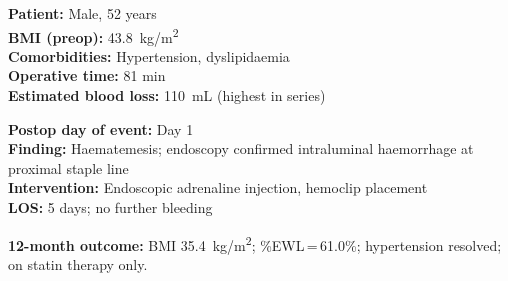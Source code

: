 \documentclass[11pt,a4paper]{article}
\begin{document}
\begin{tcolorbox}[casebox, title={\faUser\enspace Case 2\enspace\textendash\enspace
  Grade IIIa Complication: Staple-Line Haemorrhage}]
\small
\begin{minipage}[t]{0.48\linewidth}
  \textbf{\color{SurgBlue}Patient:} Male, 52 years\\
  \textbf{\color{SurgBlue}BMI (preop):} 43.8~kg/m\textsuperscript{2}\\
  \textbf{\color{SurgBlue}Comorbidities:} Hypertension, dyslipidaemia\\
  \textbf{\color{SurgBlue}Operative time:} 81 min\\
  \textbf{\color{SurgBlue}Estimated blood loss:} 110~mL (highest in series)
\end{minipage}%
\hfill%
\begin{minipage}[t]{0.48\linewidth}
  \textbf{\color{SurgBlue}Postop day of event:} Day 1\\
  \textbf{\color{SurgBlue}Finding:} Haematemesis; endoscopy confirmed
    intraluminal haemorrhage at proximal staple line\\
  \textbf{\color{SurgBlue}Intervention:} Endoscopic adrenaline injection,
    hemoclip placement\\
  \textbf{\color{SurgBlue}LOS:} 5 days; no further bleeding
\end{minipage}

\vspace{6pt}
\textbf{\color{SurgTeal}12-month outcome:} BMI 35.4~kg/m\textsuperscript{2};
\%EWL\,=\,61.0\%; hypertension resolved; on statin therapy only.
\end{tcolorbox}

\vspace{6pt}
\end{document}
